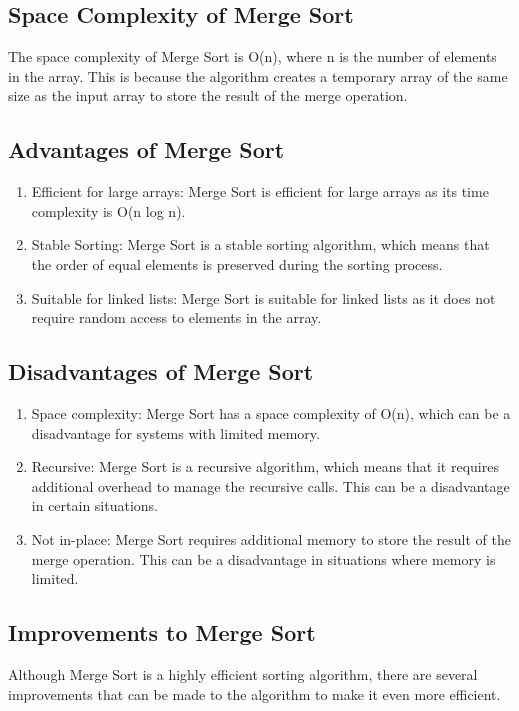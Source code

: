 \documentclass[a4paper, 11pt, oneside]{book} %
\begin{document}
\subsection{Space Complexity of Merge Sort}
The space complexity of Merge Sort is O(n), where n is the number of elements in the array. This is because the algorithm creates a temporary array of the same size as the input array to store the result of the merge operation.

\subsection{Advantages of Merge Sort}
\begin{enumerate}
  \item Efficient for large arrays: Merge Sort is efficient for large arrays as its time complexity is O(n log n).
  \item Stable Sorting: Merge Sort is a stable sorting algorithm, which means that the order of equal elements is preserved during the sorting process.
  \item Suitable for linked lists: Merge Sort is suitable for linked lists as it does not require random access to elements in the array.
\end{enumerate}

\subsection{Disadvantages of Merge Sort}
\begin{enumerate}
  \item Space complexity: Merge Sort has a space complexity of O(n), which can be a disadvantage for systems with limited memory.
  \item Recursive: Merge Sort is a recursive algorithm, which means that it requires additional overhead to manage the recursive calls. This can be a disadvantage in certain situations.
  \item Not in-place: Merge Sort requires additional memory to store the result of the merge operation. This can be a disadvantage in situations where memory is limited.
\end{enumerate}

\subsection{Improvements to Merge Sort}

Although Merge Sort is a highly efficient sorting algorithm, there are several improvements that can be made to the algorithm to make it even more efficient.
\vspace{0.75\baselineskip}
\end{document}
